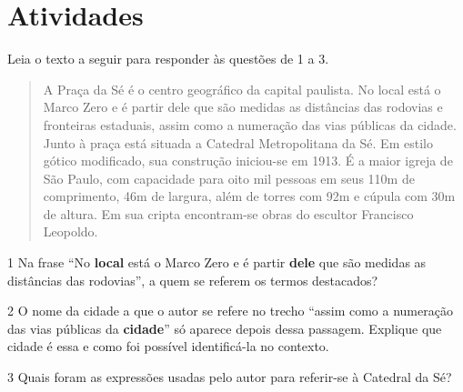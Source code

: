 \section{Atividades}

Leia o texto a seguir para responder às questões de 1 a 3.

\begin{quote}

A Praça da Sé é o centro geográfico da capital paulista. No local está o Marco Zero 
e é partir dele que são medidas as distâncias das rodovias e fronteiras estaduais, 
assim como a numeração das vias públicas da cidade. Junto à praça está situada a 
Catedral Metropolitana da Sé. Em estilo gótico modificado, sua construção iniciou-se em 1913.
É a maior igreja de São Paulo, com capacidade para oito mil pessoas em seus 110m de comprimento, 
46m de largura, além de torres com 92m e cúpula com 30m de altura. Em sua cripta encontram-se
obras do escultor Francisco Leopoldo.

\end{quote}


\num{1} Na frase ``No \textbf{local} está o Marco Zero e é partir \textbf{dele} que são medidas
as distâncias das rodovias'', a quem se referem os termos destacados?


\num{2} O nome da cidade a que o autor se refere no trecho ``assim como a numeração das vias 
públicas da \textbf{cidade}'' só aparece depois dessa passagem. Explique que cidade é essa e
como foi possível identificá-la no contexto.


\num{3} Quais foram as expressões usadas pelo autor para referir-se à Catedral da Sé?


